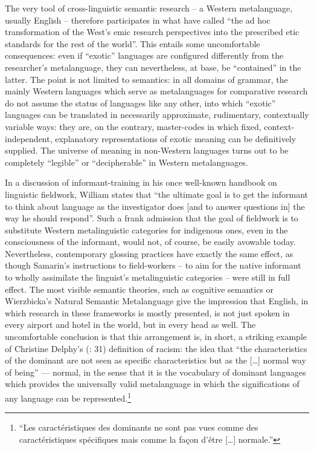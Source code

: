 \documentclass[output=paper]{langscibook}
\begin{document}
The very tool of cross-linguistic semantic research -- a Western metalanguage, usually English -- therefore participates in what \citet[109]{AnchimbeJanney2017} have called ``the ad hoc transformation of the West's emic research perspectives into the prescribed etic standards for the rest of the world''. This entails some uncomfortable consequences: even if ``exotic'' languages are configured differently from the researcher's metalanguage, they can nevertheless, at base, be ``contained'' in the latter. The point is not limited to semantics: in all domains of grammar, the mainly Western languages which serve as metalanguages for comparative research do not assume the status of languages like any other, into which ``exotic'' languages can be translated in necessarily approximate, rudimentary, contextually variable ways: they are, on the contrary, master-codes in which fixed, context-independent, explanatory representations of exotic meaning can be definitively supplied. The universe of meaning in non-Western languages turns out to be completely ``legible'' or ``decipherable'' in Western metalanguages.

In a discussion of informant-training in his once well-known \citeyear{Samarin1967} handbook on linguistic fieldwork, William \citet[41]{Samarin1967} states that ``the ultimate goal is to get the informant to think about language as the investigator does [and to answer questions in] the way he should respond''. Such a frank admission that the goal of fieldwork is to substitute Western metalinguistic categories for indigenous ones, even in the consciousness of the informant, would not, of course, be easily avowable today. Nevertheless, contemporary glossing practices have exactly the same effect, as though Samarin's instructions to field-workers -- to aim for the native informant to wholly assimilate the linguist's metalinguistic categories -- were still in full effect. The most visible semantic theories, such as cognitive semantics or Wierzbicka's Natural Semantic Metalanguage \citep[see][]{Wierzbicka1996} give the impression that English, in which research in these frameworks is mostly presented, is not just spoken in every airport and hotel in the world, but in every head as well. The uncomfortable conclusion is that this arrangement is, in short, a striking example of Christine Delphy's (\citeyear{Delphy2008}: 31) definition of racism: the idea that ``the characteristics of the dominant are not seen as specific characteristics but as the […] normal way of being''  — normal, in the sense that it is the vocabulary of dominant languages which provides the universally valid metalanguage in which the significations of any language can be represented.\footnote{``Les caractéristiques des dominants ne sont pas vues comme des caractéristiques spécifiques mais comme la façon d'être […] normale.''}
\end{document}
